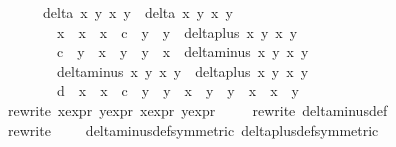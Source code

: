 \begin{isabellebody}
\ \ \ \ \ {\isacharparenleft}delta\ x{}\ y{}\ x{}\ y{}\ {\isacharasterisk}\ delta\ x{}\ y{}\ x{}\ y{}{\isacharparenright}\ {\isacharequal}\ \isanewline
\ \ \ \ \ \ \ {\isacharparenleft}x{}\ {\isacharasterisk}\ {\isacharparenleft}x{}\ {\isacharasterisk}\ x{}\ {\isacharminus}\ c\ {\isacharasterisk}\ y{}\ {\isacharasterisk}\ y{}{\isacharparenright}\ {\isacharasterisk}\ delta{\isacharunderscore}plus\ x{}\ y{}\ x{}\ y{}\ {\isacharminus}\ \isanewline
\ \ \ \ \ \ \ c\ {\isacharasterisk}\ y{}\ {\isacharasterisk}\ {\isacharparenleft}x{}\ {\isacharasterisk}\ y{}\ {\isacharplus}\ y{}\ {\isacharasterisk}\ x{}{\isacharparenright}\ {\isacharasterisk}\ delta{\isacharunderscore}minus\ x{}\ y{}\ x{}\ y{}{\isacharparenright}\ {\isacharasterisk}\isanewline
\ \ \ \ \ \ \ {\isacharparenleft}delta{\isacharunderscore}minus\ x{}\ y{}\ x{}\ y{}\ {\isacharasterisk}\ delta{\isacharunderscore}plus\ x{}\ y{}\ x{}\ y{}\ {\isacharminus}\ \isanewline
\ \ \ \ \ \ \ d\ {\isacharasterisk}\ {\isacharparenleft}x{}\ {\isacharasterisk}\ x{}\ {\isacharminus}\ c\ {\isacharasterisk}\ y{}\ {\isacharasterisk}\ y{}{\isacharparenright}\ {\isacharasterisk}\ {\isacharparenleft}x{}\ {\isacharasterisk}\ y{}\ {\isacharplus}\ y{}\ {\isacharasterisk}\ x{}{\isacharparenright}\ {\isacharasterisk}\ x{}\ {\isacharasterisk}\ y{}{\isacharparenright}{\isachardoublequoteclose}\isanewline
\ \ \ \ \isamarkupfalse%
{\isacharparenleft}rewrite\ x{}{\isacharprime}{\isacharunderscore}expr\ y{}{\isacharprime}{\isacharunderscore}expr\ x{}{\isacharprime}{\isacharunderscore}expr\ y{}{\isacharprime}{\isacharunderscore}expr{\isacharparenright}{\isacharplus}\isanewline
\ \ \ \ \isamarkupfalse%
{\isacharparenleft}rewrite\ delta{\isacharunderscore}minus{\isacharunderscore}def{\isacharparenright}\isanewline
\ \ \ \ \isamarkupfalse%
{\isacharparenleft}rewrite\ \ {\isachardoublequoteopen}{\isacharunderscore}\ {\isacharslash}\ {\isasymhole}{\isachardoublequoteclose}\ delta{\isacharunderscore}minus{\isacharunderscore}def{\isacharbrackleft}symmetric{\isacharbrackright}\ delta{\isacharunderscore}plus{\isacharunderscore}def{\isacharbrackleft}symmetric{\isacharbrackright}{\isacharparenright}{\isacharplus}\isanewline

\end{isabellebody}
